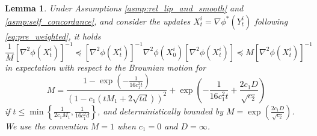 \documentclass{article}
\newtheorem{lemma}[theorem]{Lemma}
\begin{document}
\begin{lemma}\label{lem:jiang4}
    Under Assumptions \ref{asmp:rel_lip_and_smooth} and \ref{asmp:self_concordance}, and consider the updates $X_t^i = \nabla\phi^*(Y_t^i)$ following \eqref{eq:pre_weighted}, it holds \[
    \frac{1}{M}[\nabla^2\phi(X_t^i)]^{-1}\preceq [\nabla^2 \phi(X_t^i)]^{-1}\nabla^2\phi(X_0^i)[\nabla^2\phi(X_t^i)] \preceq M [\nabla^2\phi(X_t^i)]^{-1}
    \]
    in expectation with respect to the Brownian motion for \[
    M = \frac{1-\exp(-\frac{1}{16c_1^2t})}{(1-c_1(tM_1 + 2\sqrt{td}))^2} + \exp\left(-\frac{1}{16c_1^2t} + \frac{2c_1D}{\sqrt{c_2}}\right)
    \]
    if $t \le \min\left\{\frac{1}{2c_1M_1}, \frac{1}{16c_1^2d}\right\}$, and deterministically bounded by $M = \exp\left(\frac{2c_1D}{\sqrt{c_2}}\right)$. We use the convention $M = 1$ when $c_1 = 0$ and $D = \infty$. 
\end{lemma}
\end{document}

